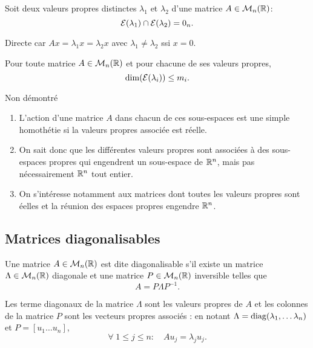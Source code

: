 \begin{proposition}
  Soit deux valeurs propres distinctes $\lambda_1$ et $\lambda_2$ d'une matrice $A \in \mathcal{M}_n(\mathbb{R})$:
  $$
  \mathcal{E}(\lambda_1) \cap \mathcal{E}(\lambda_2) = 0_n.
  $$
\end{proposition}

\proof
Directe car $Ax = \lambda_1 x = \lambda_2 x$ avec $\lambda_1 \neq \lambda_2$ ssi $x = 0$.
\eproof


\begin{proposition}
  Pour toute matrice $A \in \mathcal{M}_n(\mathbb{R})$ et pour chacune de ses valeurs propres, 
  $$
  \dim(\mathcal{E}(\lambda_i)) \leq m_i.
  $$
\end{proposition}

\proof
Non démontré
\eproof


\remarks
\begin{enumerate}
  \item L'action d'une matrice $A$ dans chacun de ces sous-espaces est une simple homothétie si la valeurs propres associée est réelle.
  \item On sait donc que les différentes valeurs propres sont associées à des sous-espaces propres qui engendrent un sous-espace de $\mathbb{R}^n$, mais pas nécessairement $\mathbb{R}^n$ tout entier. 
  \item On s'intéresse notamment aux matrices dont toutes les valeurs propres sont éelles et la réunion des espaces propres engendre $\mathbb{R}^n$.
\end{enumerate}

\subsection{Matrices diagonalisables} \label{sec:MatDiag}

\begin{definition} \label{def:matriceDiagonalisable}
  Une matrice $A \in \mathcal{M}_n(\mathbb{R})$ est dite diagonalisable s'il existe un matrice $\Lambda \in \mathcal{M}_n(\mathbb{R})$ diagonale et une matrice $P \in \mathcal{M}_n(\mathbb{R})$ inversible telles que
  $$
  A = P \Lambda P^{-1}.
  $$
\end{definition}

\begin{proposition}
  Les terme diagonaux de la matrice $\Lambda$ sont les valeurs propres de $A$ et les colonnes de la matrice $P$ sont les vecteurs propres associés :
  en notant $\Lambda = \operatorname{diag}(\lambda_1, \dots \lambda_n)$ et $P = [u_1 \dots u_n]$, 
  $$
  \forall \; 1 \leq j \leq n: \quad A u_j = \lambda_j u_j.
  $$
\end{proposition}

